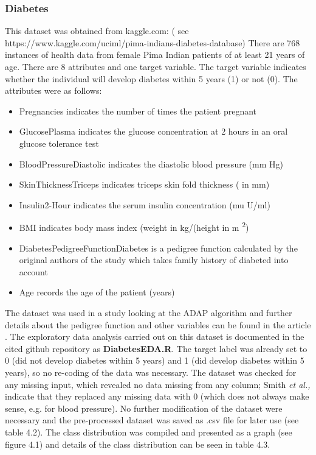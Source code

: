 \subsubsection{Diabetes}
This dataset was obtained from kaggle.com:\newline
( see https://www.kaggle.com/uciml/pima-indians-diabetes-database)\newline
There are 768 instances of health data from female Pima Indian patients of at least 21 years of age. There are 8 attributes and one target variable. The target variable indicates whether the individual will develop diabetes within 5 years (1) or not (0). The attributes were as follows:
\begin{itemize}
    \item Pregnancies indicates the number of times the patient pregnant
    \item GlucosePlasma indicates the glucose concentration at 2 hours in an oral glucose tolerance test
    \item BloodPressureDiastolic indicates the diastolic blood pressure (mm Hg)
    \item SkinThicknessTriceps indicates triceps skin fold thickness ( in mm)
    \item Insulin2-Hour indicates the serum insulin concentration  (mu U/ml)
    \item BMI indicates body mass index (weight in kg/(height in m \textsuperscript{2})
    \item DiabetesPedigreeFunctionDiabetes is a pedigree function calculated by the original authors of the study which takes family history of diabeted into account
    \item Age records the age of the patient (years)
\end{itemize}
 The dataset was used in a study looking at the ADAP algorithm and further details about the pedigree function and other variables can be found in the article \citep{Smith:1988wy}.\newline
The exploratory data analysis carried out on this dataset is documented in the cited github repository as \textbf{DiabetesEDA.R}.\newline
The target label was already set to 0 (did not develop diabetes within 5 years) and 1 (did develop diabetes within 5 years), so no re-coding of the data was necessary.\newline
The dataset was checked for any missing input, which revealed no data missing from any column; Smith \textit{et al.,} indicate that they replaced any missing data with 0 (which does not always make sense, e.g. for blood pressure). No further modification of the dataset were necessary and the pre-processed dataset was saved as .csv file for later use (see table 4.2).
The class distribution was compiled and presented as a graph (see figure 4.1) and details of the class distribution can be seen in table 4.3. 

